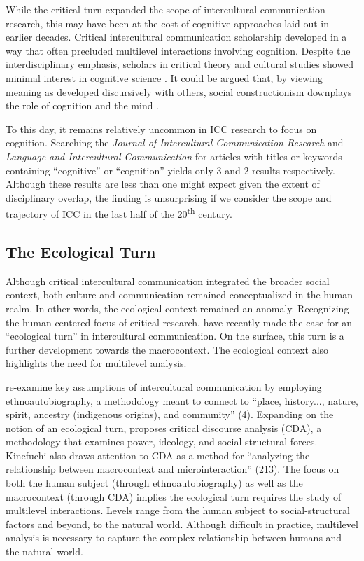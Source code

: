 While the critical turn expanded the scope of intercultural communication research, this may have been at the cost of cognitive approaches laid out in earlier decades. Critical intercultural communication scholarship developed in a way that often precluded multilevel interactions involving cognition. Despite the interdisciplinary emphasis, scholars in critical theory and cultural studies showed minimal interest in cognitive science \citep[123]{Crane1999a}. It could be argued that, by viewing meaning as developed discursively with others, social constructionism downplays the role of cognition and the mind \citep[2]{Bondebjerg2017a}. 

To this day, it remains relatively uncommon in ICC research to focus on cognition. Searching the \textit{Journal of Intercultural Communication Research} and \textit{Language and Intercultural Communication} for articles with titles or keywords containing ``cognitive'' or ``cognition'' yields only 3 and 2 results respectively. Although these results are less than one might expect given the extent of disciplinary overlap, the finding is unsurprising if we consider the scope and trajectory of ICC in the last half of the 20\textsuperscript{th} century.

\subsection{The Ecological Turn}

Although critical intercultural communication integrated the broader social context, both culture and communication remained conceptualized in the human realm. In other words, the ecological context remained an anomaly. Recognizing the human-centered focus of critical research, \cite*{Mendoza2016a} have recently made the case for an ``ecological turn'' in intercultural communication. On the surface, this turn is a further development towards the macrocontext. The ecological context also highlights the need for multilevel analysis.

\cite*{Mendoza2016a} re-examine key assumptions of intercultural communication by employing ethnoautobiography, a methodology meant to connect to ``place, history..., nature, spirit, ancestry (indigenous origins), and community'' (4). Expanding on the notion of an ecological turn, \cite*{Kinefuchi2018a} proposes critical discourse analysis (CDA), a methodology that examines power, ideology, and social-structural forces. Kinefuchi also draws attention to CDA as a method for ``analyzing the relationship between macrocontext and microinteraction'' (213). The focus on both the human subject (through ethnoautobiography) as well as the macrocontext (through CDA) implies the ecological turn requires the study of multilevel interactions. Levels range from the human subject to social-structural factors and beyond, to the natural world. Although difficult in practice, multilevel analysis is necessary to capture the complex relationship between humans and the natural world. 	

